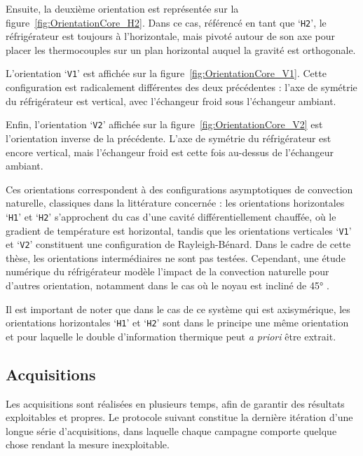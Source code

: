 Ensuite, la deuxième orientation est représentée sur la figure~\ref{fig:OrientationCore_H2}. Dans ce cas, référencé en tant que `\texttt{H2}', le réfrigérateur est toujours à l'horizontale, mais pivoté autour de son axe pour placer les thermocouples sur un plan horizontal auquel la gravité est orthogonale.\smallskip

L'orientation `\texttt{V1}' est affichée sur la figure~\ref{fig:OrientationCore_V1}. Cette configuration est radicalement différentes des deux précédentes : l'axe de symétrie du réfrigérateur est vertical, avec l'échangeur froid sous l'échangeur ambiant.\smallskip

Enfin, l'orientation `\texttt{V2}' affichée sur la figure~\ref{fig:OrientationCore_V2} est l'orientation inverse de la précédente. L'axe de symétrie du réfrigérateur est encore vertical, mais l'échangeur froid est cette fois au-dessus de l'échangeur ambiant.\medskip

Ces orientations correspondent à des configurations asymptotiques de convection naturelle, classiques dans la littérature concernée : les orientations horizontales `\texttt{H1}' et `\texttt{H2}' s'approchent du cas d'une cavité différentiellement chauffée, où le gradient de température est horizontal, tandis que les orientations verticales `\texttt{V1}' et `\texttt{V2}' constituent une configuration de Rayleigh-Bénard. Dans le cadre de cette thèse, les orientations intermédiaires ne sont pas testées. Cependant, une étude numérique du réfrigérateur modèle l'impact de la convection naturelle pour d'autres orientation, notamment dans le cas où le noyau est incliné de \ang{45} \cite{baltean_gravity_2025}.\bigskip

Il est important de noter que dans le cas de ce système qui est axisymérique, les orientations horizontales `\texttt{H1}' et `\texttt{H2}' sont dans le principe une même orientation et pour laquelle le double d'information thermique peut \textit{a priori} être extrait.\medskip




\subsection{Acquisitions}\label{chap:Acquisitions}
Les acquisitions sont réalisées en plusieurs temps, afin de garantir des résultats exploitables et propres. Le protocole suivant constitue la dernière itération d'une longue série d'acquisitions, dans laquelle chaque campagne comporte quelque chose rendant la mesure inexploitable.

